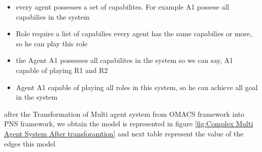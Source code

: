 \begin{itemize}

\newcommand{\localtextbulletone}{\textcolor{gray}{\raisebox{.45ex}{\rule{.6ex}{.6ex}}}}
\renewcommand{\labelitemi}{\localtextbulletone}
	\item every agent possesses a set of capabilites. For example A1 possese all capabilies in the system
	\item Role require a list of capabilies every agent has the same capabilies or more, so he can play this role 
	\item the Agent A1 possesses all capabilites in the system so we can say, A1 capable of playing R1 and R2
	\item Agent A1 capable of playing all roles in this system, so he can achieve all goal in the system
\end{itemize}
\vspace{0.7cm}
after the Transformation of Multi agent system from OMACS framework into PNS framework, we obtain the model is represented in figure \ref{fig:Complex Multi Agent System After transforamtion} 
and next table represent the value of the edges this model 


